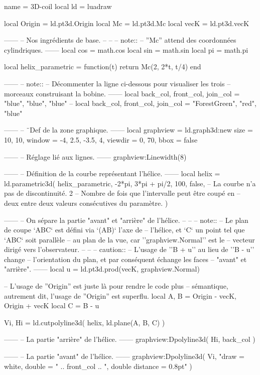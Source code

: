 \documentclass[varwidth, border = 3pt]{standalone}
\begin{document}
\begin{luadraw*}{name = 3D-coil}
local ld = luadraw

local Origin = ld.pt3d.Origin
local Mc     = ld.pt3d.Mc
local vecK   = ld.pt3d.vecK

------
-- Nos ingrédients de base.
--
--
-- note::
--     ''Mc'' attend des coordonnées cylindriques.
------
local cos = math.cos
local sin = math.sin
local pi  = math.pi

local helix_parametric = function(t)
  return Mc(2, 2*t, t/4)
end

------
-- note::
--     Décommenter la ligne ci-dessous pour visualiser les trois
--     morceaux construisant la bobine.
------
local back_col, front_col, join_col = "blue", "blue", "blue"
-- local back_col, front_col, join_col = "ForestGreen", "red", "blue"

------
-- ¨Def de la zone graphique.
------
local graphview = ld.graph3d:new{
  size    = {10, 10},
  window  = {-4, 2.5, -3.5, 4},
  viewdir = {0, 70},
  bbox = false
}

------
-- Réglage lié aux lignes.
------
graphview:Linewidth(8)

------
-- Définition de la courbe représentant l'hélice.
------
local helix = ld.parametric3d(
  helix_parametric,
  -2*pi, 3*pi + pi/2,
  100,
  false,  -- La courbe n'a pas de discontinuité.
  2       -- Nombre de fois que l’intervalle peut être coupé en
          -- deux entre deux valeurs consécutives du paramètre.
)

------
-- On sépare la partie "avant" et "arrière" de l'hélice.
--
--
-- note::
--     Le plan de coupe `ABC` est défini via `(AB)` l'axe de
--     l'hélice, et `C` un point tel que `ABC` soit parallèle
--     au plan de la vue, car ''graphview.Normal'' est le
--     vecteur dirigé vers l'observateur.
--
--
-- caution::
--     L'usage de ''B + u'' au lieu de ''B - u'' change
--     l'orientation du plan, et par conséquent échange les faces
--     "avant" et "arrière".
------
local u = ld.pt3d.prod(vecK, graphview.Normal)

-- L'usage de ''Origin'' est juste là pour rendre le code plus
-- sémantique, autrement dit, l'usage de ''Origin'' est superflu.
local A, B = Origin - vecK, Origin + vecK
local C    = B - u

Vi, Hi = ld.cutpolyline3d(
  helix,
  ld.plane(A, B, C)
)

------
-- La partie "arrière" de l'hélice.
------
graphview:Dpolyline3d(
  Hi,
  back_col
)

------
-- La partie "avant" de l'hélice.
------
graphview:Dpolyline3d(
  Vi,
     "draw = white, double = " .. front_col
  .. ", double distance = 0.8pt"
)


\end{luadraw*}
\end{document}
